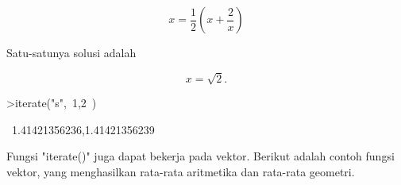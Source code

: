 \documentclass{article}
\begin{document}
\begin{eulernotebook}
\begin{eulercomment}
\begin{eulercomment}
\begin{eulercomment}
\begin{eulercomment}
\begin{eulercomment}
\begin{eulercomment}
\begin{eulercomment}
\begin{eulercomment}
\begin{eulercomment}
\begin{eulercomment}
\begin{eulercomment}
\begin{eulercomment}
\begin{eulercomment}
\begin{eulercomment}
\begin{eulercomment}
\begin{eulercomment}
\begin{eulercomment}
\begin{eulercomment}
\begin{eulercomment}
\begin{eulercomment}
\begin{eulercomment}
\begin{eulercomment}
\begin{eulercomment}
\begin{eulercomment}
\begin{eulercomment}
\begin{eulercomment}
\begin{eulercomment}
\begin{eulercomment}
\begin{eulercomment}
\begin{eulercomment}
\begin{eulercomment}
\begin{eulercomment}
\begin{eulercomment}
\end{eulercomment}
\begin{eulerformula}
\[
x = \frac{1}{2} \left( x + \frac{2}{x} \right)
\]
\end{eulerformula}
\begin{eulercomment}
Satu-satunya solusi adalah

\end{eulercomment}
\begin{eulerformula}
\[
x = \sqrt2.
\]
\end{eulerformula}
\begin{eulerprompt}
>iterate("s",~1,2~)
\end{eulerprompt}
\begin{euleroutput}
  ~1.41421356236,1.41421356239~
\end{euleroutput}
\begin{eulercomment}
Fungsi "iterate()" juga dapat bekerja pada vektor. Berikut adalah
contoh fungsi vektor, yang menghasilkan rata-rata aritmetika dan
rata-rata geometri.


\end{eulercomment}
\end{eulercomment}
\end{eulercomment}
\end{eulercomment}
\end{eulercomment}
\end{eulercomment}
\end{eulercomment}
\end{eulercomment}
\end{eulercomment}
\end{eulercomment}
\end{eulercomment}
\end{eulercomment}
\end{eulercomment}
\end{eulercomment}
\end{eulercomment}
\end{eulercomment}
\end{eulercomment}
\end{eulercomment}
\end{eulercomment}
\end{eulercomment}
\end{eulercomment}
\end{eulercomment}
\end{eulercomment}
\end{eulercomment}
\end{eulercomment}
\end{eulercomment}
\end{eulercomment}
\end{eulercomment}
\end{eulercomment}
\end{eulercomment}
\end{eulercomment}
\end{eulercomment}
\end{eulercomment}
\end{eulernotebook}
\end{document}
